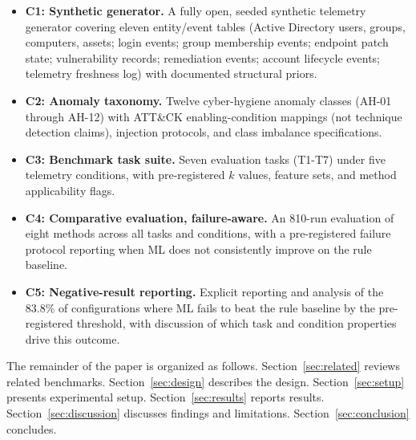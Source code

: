 \begin{itemize}[leftmargin=*]

\item \textbf{C1: Synthetic generator.} A fully open, seeded synthetic telemetry
  generator covering eleven entity/event tables (Active Directory users, groups,
  computers, assets; login events; group membership events; endpoint patch state;
  vulnerability records; remediation events; account lifecycle events; telemetry
  freshness log) with documented structural priors.

\item \textbf{C2: Anomaly taxonomy.} Twelve cyber-hygiene anomaly classes
  (AH-01 through AH-12) with ATT\&CK enabling-condition mappings (not technique
  detection claims), injection protocols, and class imbalance specifications.

\item \textbf{C3: Benchmark task suite.} Seven evaluation tasks (T1-T7) under
  five telemetry conditions, with pre-registered $k$ values, feature sets, and
  method applicability flags.

\item \textbf{C4: Comparative evaluation, failure-aware.} An 810-run evaluation of
  eight methods across all tasks and conditions, with a pre-registered failure
  protocol reporting when ML does not consistently improve on the rule baseline.

\item \textbf{C5: Negative-result reporting.} Explicit reporting and analysis of
  the 83.8\% of configurations where ML fails to beat the rule baseline by the
  pre-registered threshold, with discussion of which task and condition properties
  drive this outcome.

\end{itemize}

The remainder of the paper is organized as follows. Section~\ref{sec:related}
reviews related benchmarks. Section~\ref{sec:design} describes the \hygienebench
design. Section~\ref{sec:setup} presents experimental setup.
Section~\ref{sec:results} reports results. Section~\ref{sec:discussion} discusses
findings and limitations. Section~\ref{sec:conclusion} concludes.
